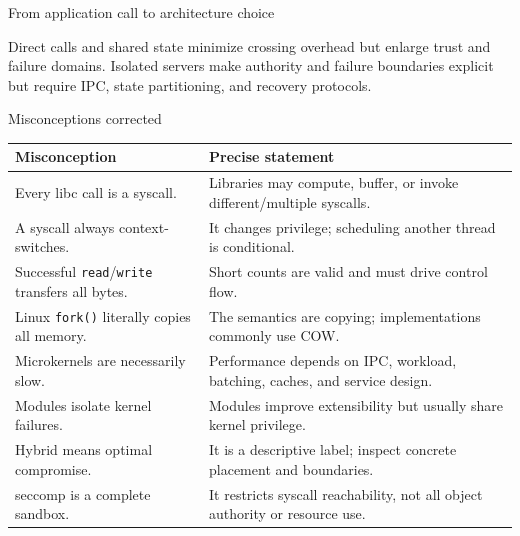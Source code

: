 \documentclass[aspectratio=169,11pt]{beamer}
\newcommand{\code}[1]{\texttt{#1}}
\begin{document}
\begin{frame}{From application call to architecture choice}
  \centering
  \begin{tcolorbox}[title=The recurring trade-off]
    Direct calls and shared state minimize crossing overhead but enlarge trust and failure domains. Isolated servers make authority and failure boundaries explicit but require IPC, state partitioning, and recovery protocols.
  \end{tcolorbox}
\end{frame}

\begin{frame}{Misconceptions corrected}
  \small
  \begin{tabularx}{\textwidth}{@{}X@{\quad$\Rightarrow$\quad}X@{}}
    \toprule
    \textbf{Misconception} & \textbf{Precise statement} \\
    \midrule
    Every libc call is a syscall. & Libraries may compute, buffer, or invoke different/multiple syscalls. \\
    A syscall always context-switches. & It changes privilege; scheduling another thread is conditional. \\
    Successful \code{read}/\code{write} transfers all bytes. & Short counts are valid and must drive control flow. \\
    Linux \code{fork()} literally copies all memory. & The semantics are copying; implementations commonly use COW. \\
    Microkernels are necessarily slow. & Performance depends on IPC, workload, batching, caches, and service design. \\
    Modules isolate kernel failures. & Modules improve extensibility but usually share kernel privilege. \\
    Hybrid means optimal compromise. & It is a descriptive label; inspect concrete placement and boundaries. \\
    seccomp is a complete sandbox. & It restricts syscall reachability, not all object authority or resource use. \\
    \bottomrule
  \end{tabularx}
\end{frame}
\end{document}
